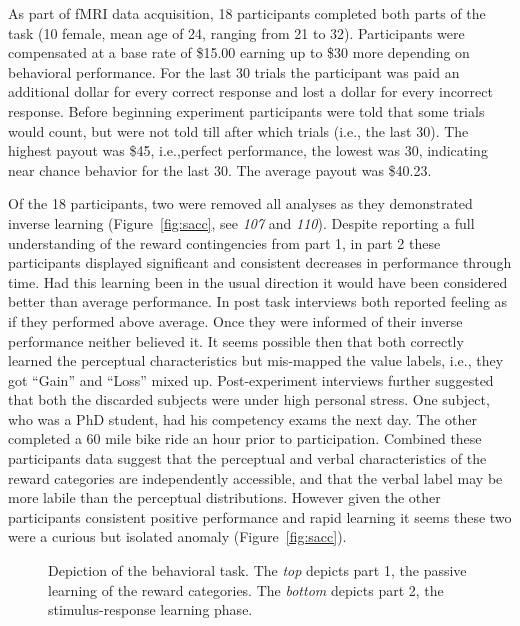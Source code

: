 \documentclass[doc,12pt]{apa}        %
\begin{document}
As part of fMRI data acquisition, 18 participants completed both parts of the task (10 female, mean age of 24, ranging from 21 to 32). Participants were compensated at a base rate of \$15.00 earning up to \$30 more depending on behavioral performance. For the last 30 trials the participant was paid an additional dollar for every correct response and lost a dollar for every incorrect response.  Before beginning experiment participants were told that some trials would count, but were not told till after which trials (i.e., the last 30).  The highest payout was \$45, i.e.,perfect performance, the lowest was 30, indicating near chance behavior for the last 30.  The average payout was \$40.23.

Of the 18 participants, two were removed all analyses as they demonstrated inverse learning (Figure~\ref{fig:sacc}, see \emph{107} and \emph{110}).  Despite reporting a full understanding of the reward contingencies from part 1, in part 2 these participants displayed significant and consistent decreases in performance through time.  Had this learning been in the usual direction it would have been considered better than average performance.  In post task interviews both reported feeling as if they performed above average.  Once they were informed of their inverse performance neither believed it.  It seems possible then that both correctly learned the perceptual characteristics but mis-mapped the value labels, i.e., they got ``Gain'' and ``Loss''  mixed up.  Post-experiment interviews further suggested that both the discarded subjects were under high personal stress.  One subject, who was a PhD student, had his competency exams the next day.  The other completed a 60 mile bike ride an hour prior to participation.  Combined these participants data suggest that the perceptual and verbal characteristics of the reward categories are independently accessible, and that the verbal label may be more labile than the perceptual distributions.  However given the other participants consistent positive performance and rapid learning it seems these two were a curious but isolated anomaly (Figure~\ref{fig:sacc}).

\begin{figure}[tp]
    \centering
    \caption{Depiction of the behavioral task.  The \emph{top} depicts part 1, the passive learning of the reward categories.  The \emph{bottom} depicts part 2, the stimulus-response learning phase.}
	\label{fig:task}
\end{figure}
\end{document}
